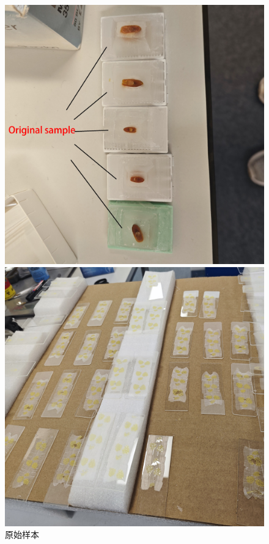 
\begin{figure}[H]
    \centering
    \begin{minipage}{0.3\textwidth}
        \centering
        \includegraphics[width=\textwidth]{./fig/sample - 副本.jpg}
        \caption{原始样本}
        \label{label:sample}
    \end{minipage}
    \begin{minipage}{0.3\textwidth}
        \centering
        \includegraphics[width=\textwidth]{./fig/采集样本.jpg}

\end{minipage}
\end{figure}

